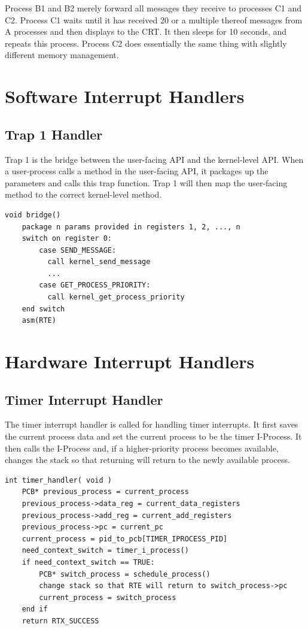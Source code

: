 \documentclass[titlepage]{article}
\begin{document}
Process B1 and B2 merely forward all messages they receive to processes C1 and
C2.  Process C1 waits until it has received 20 or a multiple thereof messages
from A processes and then displays to the CRT.  It then sleeps for 10 seconds,
and repeats this process. Process C2 does essentially the same thing with
slightly different memory management.

\section{Software Interrupt Handlers}
\subsection{Trap 1 Handler}
Trap 1 is the bridge between the user-facing API and the kernel-level API. When
a user-process calls a method in the user-facing API, it packages up the
parameters and calls this trap function. Trap 1 will then map the user-facing
method to the correct kernel-level method.

\begin{verbatim}
void bridge()
    package n params provided in registers 1, 2, ..., n
    switch on register 0:
        case SEND_MESSAGE:
          call kernel_send_message
          ...
        case GET_PROCESS_PRIORITY:
          call kernel_get_process_priority
    end switch
    asm(RTE)
\end{verbatim}

\section{Hardware Interrupt Handlers}

\subsection{Timer Interrupt Handler}
The timer interrupt handler is called for handling timer interrupts. It first
saves the current process data and set the current process to be the timer
I-Process. It then calls the I-Process and, if a higher-priority process
becomes available, changes the stack so that returning will return to the newly
available process.

\begin{verbatim}
int timer_handler( void )
    PCB* previous_process = current_process
    previous_process->data_reg = current_data_registers
    previous_process->add_reg = current_add_registers
    previous_process->pc = current_pc
    current_process = pid_to_pcb[TIMER_IPROCESS_PID]
    need_context_switch = timer_i_process()
    if need_context_switch == TRUE:
        PCB* switch_process = schedule_process()
        change stack so that RTE will return to switch_process->pc
        current_process = switch_process
    end if
    return RTX_SUCCESS
\end{verbatim}
\end{document}
